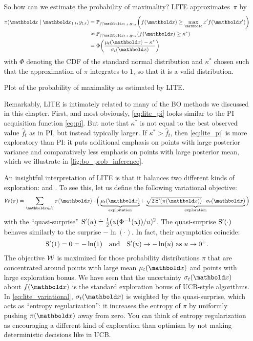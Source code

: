 So how can we estimate the probability of maximality? LITE approximates~$\pi$ by \begin{align}
  \pi(\vx \mid \vx_{1:t}, y_{1:t}) &= \Pr[f \mid \vx_{1:t}, y_{1:t}]{f(\vx) \geq \max_\vxp f(\vxp)} \nonumber \\
  &\approx \Pr[f \mid \vx_{1:t}, y_{1:t}]{f(\vx) \geq \kappa^*} \label{eq:lite_pi} \\
  &= \Phi\parentheses*{\frac{\mu_t(\vx) - \kappa^*}{\sigma_t(\vx)}} \label{eq:lite}
\end{align} with $\Phi$ denoting the CDF of the standard normal distribution and $\kappa^*$ chosen such that the approximation of $\pi$ integrates to $1$, so that it is a valid distribution.

\begin{marginfigure}
  \caption{Plot of the probability of maximality as estimated by LITE.}
  \label{fig:bo_prob_inference}
\end{marginfigure}

Remarkably, LITE is intimately related to many of the BO methods we discussed in this chapter.
First, and most obviously, \cref{eq:lite_pi} looks similar to the PI acquisition function \eqref{eq:pi}.
But note that $\kappa^*$ is not equal to the best observed value $\hat{f}_t$ as in PI, but instead typically larger.
If $\kappa^* > \hat{f}_t$, then \cref{eq:lite_pi} is more exploratory than PI: it puts additional emphasis on points with large posterior variance and comparatively less emphasis on points with large posterior mean, which we illustrate in \cref{fig:bo_prob_inference}.

An insightful interpretation of LITE is that it balances two different kinds of exploration:  and .
To see this, let us define the following variational objective: \begin{align}
  \spW(\pi) \defeq \sum_{\vx \in \spX} \pi(\vx) \cdot \Big( \underbrace{\mu_t(\vx)}_{\text{exploitation}} + \underbrace{\sqrt{2 \, \fnS'(\pi(\vx))} \cdot \sigma_t(\vx)}_{\text{exploration}} \Big) \label{eq:lite_variational}
\end{align} with the ``quasi-surprise'' $\mathrm{S}'(u) \overset{.}{=} \frac{1}{2}(\phi(\Phi^{-1}(u))/u)^2$.
The quasi-surprise $\mathrm{S}'(\cdot)$ behaves similarly to the surprise $-\ln(\cdot)$.
In fact, their asymptotics coincide: \begin{align*}
  \mathrm{S}'(1) = 0 = - \ln(1) \quad\text{and}\quad \mathrm{S}'(u) \to - \ln(u) \text{ as } u \to 0^+.
\end{align*}
The objective $\mathcal{W}$ is maximized for those probability distributions $\pi$ that are concentrated around points with large mean $\mu_t(\vx)$ and points with large exploration bonus.
We have seen that the uncertainty $\sigma_t(\vx)$ about $f(\vx)$ is the standard exploration bonus of UCB-style algorithms.
In \cref{eq:lite_variational}, $\sigma_t(\vx)$ is weighted by the quasi-surprise, which acts as ``entropy regularization'': it increases the entropy of $\pi$ by uniformly pushing $\pi(\vx)$ away from zero.
You can think of entropy regularization as encouraging a different kind of exploration than optimism by not making deterministic decisions like in UCB.

